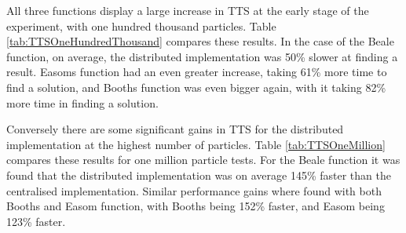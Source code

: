 \documentclass[oneside,12pt]{book}
\begin{document}
All three functions display a large increase in TTS at the early stage of the experiment, with one hundred thousand particles. Table \ref{tab:TTSOneHundredThousand} compares these results. In the case of the Beale function, on average, the distributed implementation was 50\% slower at finding a result. Easoms function had an even greater increase, taking 61\% more time to find a solution, and Booths function was even bigger again, with it taking 82\% more time in finding a solution. 

\begin{table}[H]
  \caption{TTS Results for 100,000 Particles}    
  \label{tab:TTSOneHundredThousand}%
\end{table}%

Conversely there are some significant gains in TTS for the distributed implementation at the highest number of particles. Table \ref{tab:TTSOneMillion} compares these results for one million particle tests. For the Beale function it was found that the distributed implementation was on average 145\% faster than the centralised implementation. Similar performance gains where found with both Booths and Easom function, with Booths being 152\% faster, and Easom being 123\% faster. 
\end{document}
